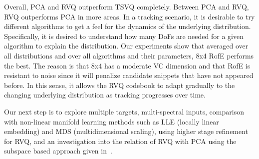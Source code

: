 Overall, PCA and RVQ outperform TSVQ completely.  Between PCA and RVQ, RVQ outperforms PCA in more areas.  In a tracking scenario, it is desirable to try different algorithms to get a feel for the dynamics of the underlying distribution.  Specifically, it is desired to understand how many DoFs are needed for a given algorithm to explain the distribution.  Our experiments show that averaged over all distributions and over all algorithms and their parameters, 8x4 RofE performs the best.  The reason is that 8x4 has a moderate VC dimension and that RofE is resistant to noise since it will penalize candidate snippets that have not appeared before.  In this sense, it allows the RVQ codebook to adapt gradually to the changing underlying distribution as tracking progresses over time.

Our next step is to explore multiple targets, multi-spectral inputs, comparison with non-linear manifold learning methods such as LLE (locally linear embedding) and MDS (multidimensional scaling), using higher stage refinement for RVQ, and an investigation into the relation of RVQ with PCA using the subspace based approach given in~\cite{2004_CNF_KmeansVsPCA_DingHe}.
